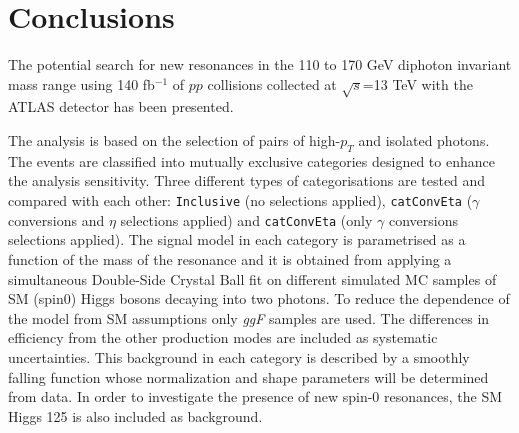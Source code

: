 \documentclass[a4paper, oneside, 11pt, openright]{book}
\begin{document}
 			
 			
 			
	\chapter{Conclusions}\label{chapter:5}
		The potential search for new resonances in the 110 to 170 GeV diphoton invariant mass range using 140 fb$^{-1}$ of $pp$ collisions collected at $\sqrt{s}$=13 TeV with the ATLAS detector has been presented.
		
		
		
		The analysis is based on the selection of pairs of high-$p_T$ and isolated photons. The events are classified into mutually exclusive categories designed to enhance the analysis sensitivity. Three different types of categorisations are tested and compared with each other: \texttt{Inclusive} (no selections applied), \texttt{catConvEta} ($\gamma$ conversions and $\eta$  selections applied) and \texttt{catConvEta} (only $\gamma$ conversions selections applied). The signal model in each category is parametrised as a function of the mass of the resonance and it is obtained from applying a simultaneous Double-Side Crystal Ball fit on different simulated MC samples of SM (spin0) Higgs bosons decaying into two photons. To reduce the dependence of the model from SM assumptions only \textit{ggF} samples are used. The differences in efficiency from the other production modes are included as systematic uncertainties. This background in each category is described by a smoothly falling function whose normalization and shape parameters will be determined from data. In order to investigate the presence of new spin-0 resonances, the SM Higgs 125 is also included as background. 
		
\end{document}
